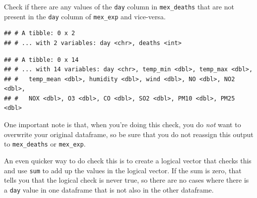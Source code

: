 \documentclass[]{book}
\makeatletter
\newenvironment{Shaded}{\begin{snugshade}}{\end{snugshade}}
\newcommand{\KeywordTok}[1]{\textcolor[rgb]{0.13,0.29,0.53}{\textbf{#1}}}
\newcommand{\StringTok}[1]{\textcolor[rgb]{0.31,0.60,0.02}{#1}}
\newcommand{\OperatorTok}[1]{\textcolor[rgb]{0.81,0.36,0.00}{\textbf{#1}}}
\newcommand{\NormalTok}[1]{#1}
\newenvironment{kframe}{%
\medskip{}
\setlength{\fboxsep}{.8em}
 \def\at@end@of@kframe{}%
 \ifinner\ifhmode%
  \def\at@end@of@kframe{\end{minipage}}%
  \begin{minipage}{\columnwidth}%
 \fi\fi%
 \def\FrameCommand##1{\hskip\@totalleftmargin \hskip-\fboxsep
 \colorbox{shadecolor}{##1}\hskip-\fboxsep
     \hskip-\linewidth \hskip-\@totalleftmargin \hskip\columnwidth}%
 \MakeFramed {\advance\hsize-\width
   \@totalleftmargin\z@ \linewidth\hsize
   \@setminipage}}%
 {\par\unskip\endMakeFramed%
 \at@end@of@kframe}
\renewenvironment{Shaded}{\begin{kframe}}{\end{kframe}}
\theoremstyle{definition}
\theoremstyle{definition}
\theoremstyle{definition}
\theoremstyle{remark}
\makeatother
\begin{document}
Check if there are any values of the \texttt{day} column in
\texttt{mex\_deaths} that are not present in the \texttt{day} column of
\texttt{mex\_exp} and vice-versa.

\begin{Shaded}
\end{Shaded}

\begin{verbatim}
## # A tibble: 0 x 2
## # ... with 2 variables: day <chr>, deaths <int>
\end{verbatim}

\begin{Shaded}
\end{Shaded}

\begin{verbatim}
## # A tibble: 0 x 14
## # ... with 14 variables: day <chr>, temp_min <dbl>, temp_max <dbl>,
## #   temp_mean <dbl>, humidity <dbl>, wind <dbl>, NO <dbl>, NO2 <dbl>,
## #   NOX <dbl>, O3 <dbl>, CO <dbl>, SO2 <dbl>, PM10 <dbl>, PM25 <dbl>
\end{verbatim}

One important note is that, when you're doing this check, you do
\emph{not} want to overwrite your original dataframe, so be sure that
you do not reassign this output to \texttt{mex\_deaths} or
\texttt{mex\_exp}.

An even quicker way to do check this is to create a logical vector that
checks this and use \texttt{sum} to add up the values in the logical
vector. If the sum is zero, that tells you that the logical check is
never true, so there are no cases where there is a \texttt{day} value in
one dataframe that is not also in the other dataframe.

\begin{Shaded}
\end{Shaded}
\end{document}
